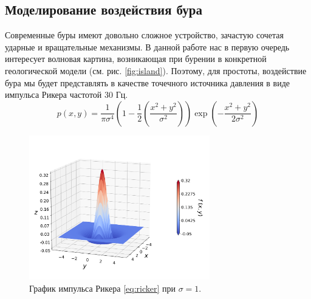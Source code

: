 \subsection{Моделирование воздействия бура}

Современные буры имеют довольно сложное устройство, зачастую сочетая ударные и вращательные механизмы. В данной работе нас в первую очередь интересует волновая картина, возникающая при бурении в конкретной геологической модели (см. рис. \autoref{fig:island}). Поэтому, для простоты, воздействие бура мы будет представлять в качестве точечного источника давления в виде импульса Рикера частотой 30 Гц.
\begin{equation}
    p(x,y) = \dfrac{1}{\pi \sigma^4} \left(1-\dfrac{1}{2}\left(\dfrac{x^2+y^2}{\sigma^2}\right)\right) \exp\left({-\frac{x^2+y^2}{2\sigma^2}}\right)
    \label{eq:ricker}
\end{equation}

\begin{figure}[htb]
    \centering
    \includegraphics[trim={0px 45px 0px 80px},clip,width=0.7\textwidth]{images/gas_field/ricker_wavelet.png}
    \caption{График импульса Рикера \eqref{eq:ricker} при $\sigma=1$.}
    \label{fig:ricker_plot}
\end{figure}

